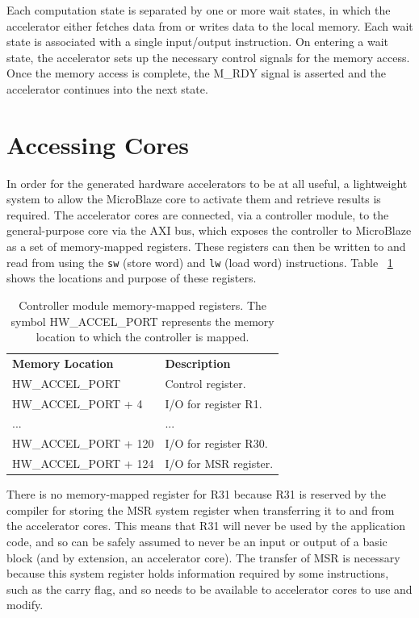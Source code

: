 \documentclass{UoYCSproject}
\begin{document}
Each computation state is separated by one or more wait states, in which the accelerator either fetches data from or writes data
to the local memory. Each wait state is associated with a single input/output instruction. On entering a wait state, the accelerator sets up the necessary control
signals for the memory access. Once the memory access is complete, the M\_RDY signal is asserted and the accelerator continues
into the next state.

\section{Accessing Cores}

In order for the generated hardware accelerators to be at all useful, a lightweight system to allow the MicroBlaze core to
activate them and retrieve results is required. The accelerator cores are connected, via a controller module, to the
general-purpose core via the AXI bus, which exposes the controller to MicroBlaze as a set of memory-mapped registers.
These registers can then be written to and read from using the \texttt{sw} (store word) and \texttt{lw} (load word) instructions.
Table ~\ref{table:controllerRegisters} shows the locations and purpose of these registers.

\begin{table}[H]
\centering
\begin{tabular}{ |p{6cm}|p{7cm} }
\textbf{Memory Location}   & \textbf{Description}        \\
HW\_ACCEL\_PORT            & Control register.         \\[0.05cm]
HW\_ACCEL\_PORT + 4        & I/O for register R1.      \\[0.05cm]
...                        & ...                       \\[0.05cm]
HW\_ACCEL\_PORT + 120      & I/O for register R30.     \\[0.05cm]
HW\_ACCEL\_PORT + 124      & I/O for MSR register.     \\[0.05cm]
\end{tabular}
\caption{Controller module memory-mapped registers. The symbol HW\_ACCEL\_PORT represents the memory location to which the controller is mapped.}
\label{table:controllerRegisters}
\end{table}

There is no memory-mapped register for R31 because R31 is reserved by the compiler for storing the MSR system register when
transferring it to and from the accelerator cores. This means that R31 will never be used by the application code, and so
can be safely assumed to never be an input or output of a basic block (and by extension, an accelerator core). The transfer
of MSR is necessary because this system register holds information required by some instructions, such as the carry flag,
and so needs to be available to accelerator cores to use and modify.
\end{document}
